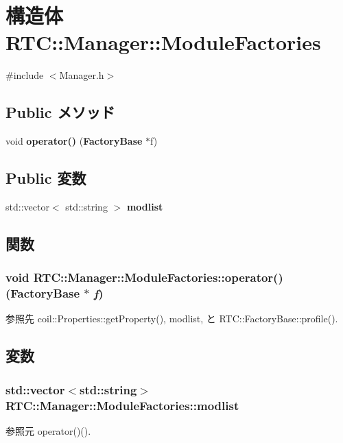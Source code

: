 \section{構造体 RTC::Manager::ModuleFactories}
\label{structRTC_1_1Manager_1_1ModuleFactories}


{\ttfamily \#include $<$Manager.h$>$}

\subsection*{Public メソッド}
\begin{DoxyCompactItemize}
\item 
void {\bf operator()} ({\bf FactoryBase} $\ast$f)
\end{DoxyCompactItemize}
\subsection*{Public 変数}
\begin{DoxyCompactItemize}
\item 
std::vector$<$ std::string $>$ {\bf modlist}
\end{DoxyCompactItemize}


\subsection{関数}
\subsubsection[{operator()}]{\setlength{\rightskip}{0pt plus 5cm}void RTC::Manager::ModuleFactories::operator() ({\bf FactoryBase} $\ast$ {\em f})\hspace{0.3cm}{\ttfamily  [inline]}}\label{structRTC_1_1Manager_1_1ModuleFactories_a60f104208930ef04a6977f30f3498445}


参照先 coil::Properties::getProperty(), modlist, と RTC::FactoryBase::profile().



\subsection{変数}
\subsubsection[{modlist}]{\setlength{\rightskip}{0pt plus 5cm}std::vector$<$std::string$>$ {\bf RTC::Manager::ModuleFactories::modlist}}\label{structRTC_1_1Manager_1_1ModuleFactories_a92469a60138308285e8112b60afa1faa}


参照元 operator()().

